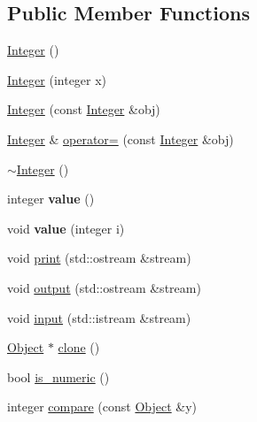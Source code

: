 \subsection*{Public Member Functions}
\begin{DoxyCompactItemize}
\item 
\hyperlink{classez_1_1objects_1_1Integer_affb53a3df3747d3571f59533fb806a7f}{Integer} ()
\item 
\hyperlink{classez_1_1objects_1_1Integer_abbfeeb57ba1420103085e186c1aedb75}{Integer} (integer x)
\item 
\hyperlink{classez_1_1objects_1_1Integer_a0c7e18a60b0f3ecef05be8c969fcebc9}{Integer} (const \hyperlink{classez_1_1objects_1_1Integer}{Integer} \&obj)
\item 
\hyperlink{classez_1_1objects_1_1Integer}{Integer} \& \hyperlink{classez_1_1objects_1_1Integer_ae52610e2e76d891ac3c559c2b2d5ff3e}{operator=} (const \hyperlink{classez_1_1objects_1_1Integer}{Integer} \&obj)
\item 
\hyperlink{classez_1_1objects_1_1Integer_a0fd905ab5b0c4f22118e77da28a5bd66}{$\sim$\+Integer} ()
\item 
\mbox{\label{classez_1_1objects_1_1Integer_a460e2f806a754e765bf5c6dbe1206cc8}} 
integer {\bfseries value} ()
\item 
\mbox{\label{classez_1_1objects_1_1Integer_a393519e75f5d9996acb2ea901a51552a}} 
void {\bfseries value} (integer i)
\item 
void \hyperlink{classez_1_1objects_1_1Integer_a4d358be1f412fd702bd332cc4bf113bf}{print} (std\+::ostream \&stream)
\item 
void \hyperlink{classez_1_1objects_1_1Integer_ab6035639fbee8c61086db044b731e213}{output} (std\+::ostream \&stream)
\item 
void \hyperlink{classez_1_1objects_1_1Integer_af465d88d1b132f7131be7b29aadc5a8f}{input} (std\+::istream \&stream)
\item 
\hyperlink{classez_1_1objects_1_1Object}{Object} $\ast$ \hyperlink{classez_1_1objects_1_1Integer_a83913903bdcb955ae11a08d12d9e26c6}{clone} ()
\item 
bool \hyperlink{classez_1_1objects_1_1Integer_a8b35ec8937520b2227650aa489427bcd}{is\+\_\+numeric} ()
\item 
integer \hyperlink{classez_1_1objects_1_1Integer_ab49e5990b97a97b1954dfa9222d29c82}{compare} (const \hyperlink{classez_1_1objects_1_1Object}{Object} \&y)

\end{DoxyCompactItemize}
